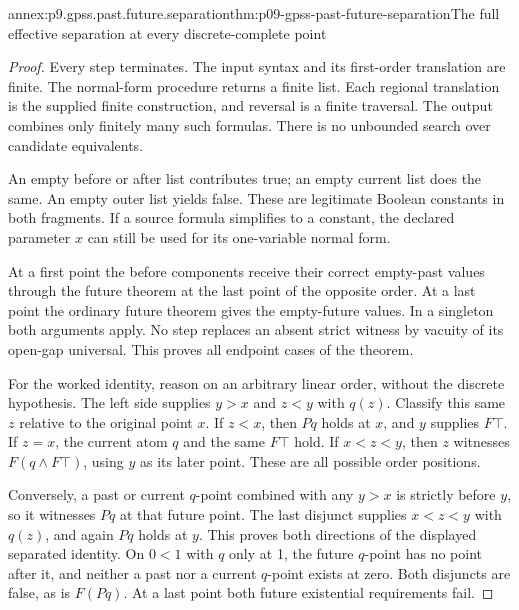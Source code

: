 \begin{annexitem}{annex:p9.gpss.past.future.separation}{thm:p09-gpss-past-future-separation}{The full effective separation at every discrete-complete point}
\begin{proof}
Every step terminates. The
input syntax and its
first-order translation are
finite. The normal-form
procedure returns a finite
list. Each regional translation
is the supplied finite
construction, and reversal
is a finite traversal.
The output combines only
finitely many such formulas.
There is no unbounded search
over candidate equivalents.

An empty before or after
list contributes true;
an empty current list
does the same. An empty
outer list yields false.
These are legitimate Boolean
constants in both fragments.
If a source formula simplifies
to a constant, the declared
parameter \(x\) can still
be used for its one-variable
normal form.

At a first point the before
components receive their
correct empty-past values
through the future theorem
at the last point of the
opposite order. At a last
point the ordinary future
theorem gives the empty-future
values. In a singleton
both arguments apply.
No step replaces an absent
strict witness by vacuity
of its open-gap universal.
This proves all endpoint
cases of the theorem.

For the worked identity,
reason on an arbitrary
linear order, without
the discrete hypothesis.
The left side supplies
\(y>x\) and \(z<y\)
with \(q(z)\). Classify
this same \(z\) relative
to the original point \(x\).
If \(z<x\), then \(Pq\)
holds at \(x\), and \(y\)
supplies \(F\top\).
If \(z=x\), the current
atom \(q\) and the
same \(F\top\) hold.
If \(x<z<y\), then
\(z\) witnesses
\(F(q\land F\top)\),
using \(y\) as its
later point. These
are all possible
order positions.

Conversely, a past or
current \(q\)-point
combined with any
\(y>x\) is strictly
before \(y\), so
it witnesses \(Pq\)
at that future point.
The last disjunct
supplies \(x<z<y\)
with \(q(z)\), and
again \(Pq\) holds
at \(y\). This
proves both directions
of the displayed
separated identity.
On \(0<1\) with
\(q\) only at 1,
the future \(q\)-point
has no point after
it, and neither a
past nor a current
\(q\)-point exists
at zero. Both
disjuncts are false,
as is \(F(Pq)\).
At a last point
both future existential
requirements fail.
\end{proof}
\end{annexitem}

